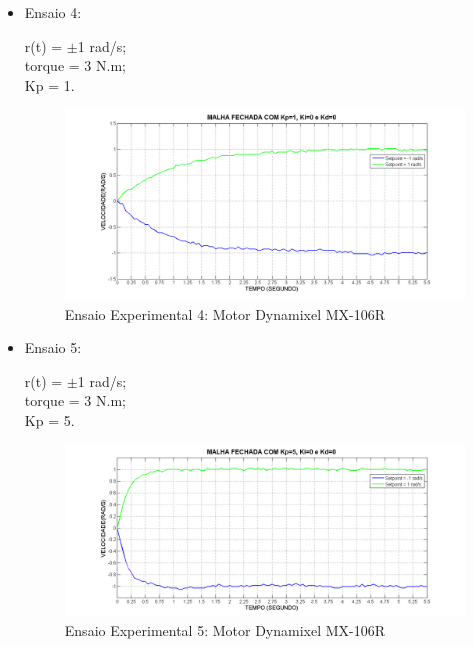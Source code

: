 \documentclass[12pt,oneside,a4paper, chapter=TITLE, section = TITLE, english, brazil]{abntex2}
\begin{document}
\begin{itemize}
\item Ensaio 4:
 
r(t) = $\pm$1 rad/s;\\
torque = 3 N.m;\\
Kp = 1.\\

\begin{figure}[h] %
\centering
\includegraphics[scale=0.47]{./imagens/Ensaio4}
\caption[Ensaio Experimental Motor 4: Motor Dynamixel MX-106R]{Ensaio Experimental 4: Motor Dynamixel MX-106R}
\label{fig:ensaio4}

\end{figure}

\item Ensaio 5:
 
r(t) = $\pm$1 rad/s;\\
torque = 3 N.m;\\
Kp = 5.

\begin{figure}[h] %
\centering
\includegraphics[scale=0.46]{./imagens/Ensaio5}
\caption[Ensaio Experimental Motor 5: Motor Dynamixel MX-106R]{Ensaio Experimental 5: Motor Dynamixel MX-106R}
\label{fig:ensaio5}
\end{figure}

\end{itemize}
\end{document}
